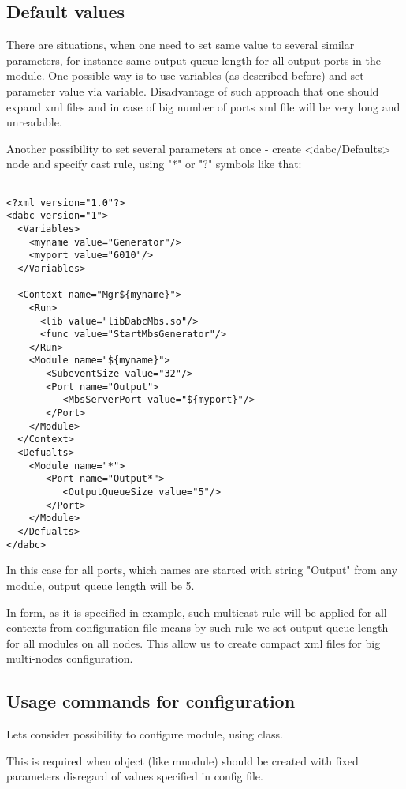 \subsection{Default values}

There are situations, when one need to set same value to several similar parameters,
for instance same output queue length for all output ports in the module. One possible way
is to use variables (as described before) and set parameter value via variable. 
Disadvantage of such approach that one should expand xml files and in case 
of big number of ports xml file will be very long and unreadable.

Another possibility to set several parameters at once - create <dabc/Defaults> node and
specify cast rule, using "*" or "?" symbols like that: 

\begin{verbatim}

<?xml version="1.0"?>
<dabc version="1">
  <Variables>
    <myname value="Generator"/> 
    <myport value="6010"/> 
  </Variables>

  <Context name="Mgr${myname}">
    <Run>
      <lib value="libDabcMbs.so"/>
      <func value="StartMbsGenerator"/>
    </Run>
    <Module name="${myname}">
       <SubeventSize value="32"/>
       <Port name="Output">
          <MbsServerPort value="${myport}"/>
       </Port>
    </Module>
  </Context>
  <Defualts>
    <Module name="*">
       <Port name="Output*">
          <OutputQueueSize value="5"/>
       </Port>
    </Module>
  </Defualts>
</dabc>

\end{verbatim}

In this case for all ports, which names are started with string "Output" from any module,
output queue length will be 5. 

In form, as it is specified in example, such multicast rule will be applied for 
all contexts from configuration file means by such rule we set output queue length 
for all modules on all nodes. This allow us to create compact xml files for big multi-nodes configuration.   


\subsection{Usage commands for configuration}

Lets consider possibility to configure module, using  class.

This is required when object (like mnodule) should be created with fixed parameters
disregard of values specified in config file.

